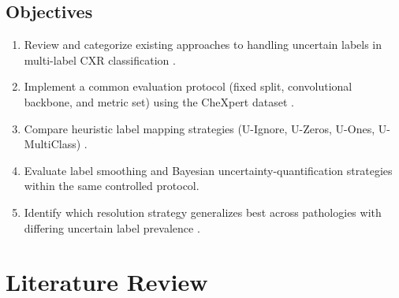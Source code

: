 \documentclass[conference]{IEEEtran}
\begin{document}
\subsection{Objectives}
\begin{enumerate}
\item Review and categorize existing approaches to handling uncertain labels in multi-label CXR classification \cite{ref1,ref2,ref3,ref4,ref5,ref6,ref7,ref8,ref9,ref10,ref11,ref12,ref13,ref14,ref15,ref16,ref17}.
\item Implement a common evaluation protocol (fixed split, convolutional backbone, and metric set) using the CheXpert dataset \cite{ref1}.
\item Compare heuristic label mapping strategies (U-Ignore, U-Zeros, U-Ones, U-MultiClass) \cite{ref1,ref10,ref11}.
\item Evaluate label smoothing \cite{ref5} and Bayesian uncertainty-quantification \cite{ref8,ref11} strategies within the same controlled protocol.
\item Identify which resolution strategy generalizes best across pathologies with differing uncertain label prevalence \cite{ref1}.
\end{enumerate}

\section{Literature Review}
\end{document}
